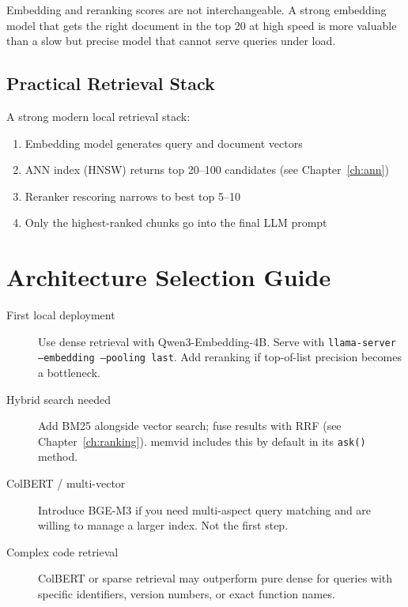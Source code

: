 Embedding and reranking scores are not interchangeable. A strong embedding model that gets
the right document in the top 20 at high speed is more valuable than a slow but precise model
that cannot serve queries under load.

\subsection{Practical Retrieval Stack}

A strong modern local retrieval stack:

\begin{enumerate}
    \item Embedding model generates query and document vectors
    \item ANN index (HNSW) returns top 20--100 candidates (see Chapter~\ref{ch:ann})
    \item Reranker rescoring narrows to best top 5--10
    \item Only the highest-ranked chunks go into the final LLM prompt
\end{enumerate}

\section{Architecture Selection Guide}

\begin{description}
    \item[First local deployment] Use dense retrieval with Qwen3-Embedding-4B. Serve with
          \texttt{llama-server --embedding --pooling last}. Add reranking if top-of-list
          precision becomes a bottleneck.
    \item[Hybrid search needed] Add BM25 alongside vector search; fuse results with RRF (see
          Chapter~\ref{ch:ranking}). memvid includes this by default in its \texttt{ask()} method.
    \item[ColBERT / multi-vector] Introduce BGE-M3 if you need multi-aspect query matching
          and are willing to manage a larger index. Not the first step.
    \item[Complex code retrieval] ColBERT or sparse retrieval may outperform pure dense for
          queries with specific identifiers, version numbers, or exact function names.
\end{description}
